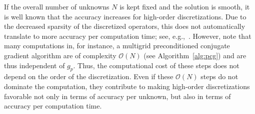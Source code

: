 \documentclass[times]{nlaauth}
\begin{document}


%
%


If the overall number of unknowns $N$ is kept fixed and the
solution is smooth, it is well known that the accuracy increases for
high-order discretizations. Due to the decreased sparsity of the
discretized operators, this does not automatically translate to more
accuracy per computation time; see, e.g.,~\cite{Brown10}. However, note
that many computations in, for instance, a multigrid
preconditioned conjugate gradient algorithm are of complexity
$\mathcal{O}(N)$ (see Algorithm~\ref{alg:pcg}) and are thus independent of
$g_p$. Thus, the computational cost of these steps does not depend on
the order of the discretization. Even if these $\mathcal{O}(N)$ steps
do not dominate the computation, they contribute to making high-order
discretizations favorable not only in terms of accuracy per unknown,
but also in terms of accuracy per computation time.
\end{document}
